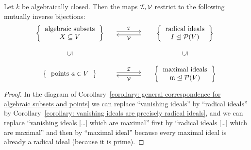 \begin{corollary}
  \label{corollary: algebraically closed correspondence for algebraic subsets and points}
  Let $k$ be algebraically closed.
  Then the maps $\mathcal{I}, \mathcal{V}$ restrict to the following mutually inverse bijections:
  \[
    \begin{matrix}
        \left\{
          \begin{tabular}{c}
              algebraic subsets \\
              $X \subseteq V$
          \end{tabular}
        \right\}
      & \begin{tikzcd}[column sep = large]
            {}
            \arrow[shift left]{r}{\mc{I}}
          & {}
            \arrow[shift left]{l}{\mc{V}}
        \end{tikzcd}
      & \left\{
          \begin{tabular}{c}
            radical ideals \\
            $I \idealleq \mc{P}(V)$
          \end{tabular}
        \right\}
      \\
        {}
      & {}
      & {}
      \\
        \rotatebox[origin=c]{90}{$\subseteq$}
      & {}
      & \rotatebox[origin=c]{90}{$\subseteq$}
      \\
        {}
      & {}
      & {}
      \\
        \left\{
          \begin{tabular}{c}
            points $a \in V$
          \end{tabular}
        \right\}
      & \begin{tikzcd}[column sep = large]
            {}
            \arrow[shift left]{r}{\mc{I}}
          & {}
            \arrow[shift left]{l}{\mc{V}}
        \end{tikzcd}
      & \left\{
          \begin{tabular}{c}
            maximal ideals \\
            $\mf{m} \idealleq \mc{P}(V)$
          \end{tabular}
        \right\}
    \end{matrix}
  \]
\end{corollary}


\begin{proof}
  In the diagram of Corollary~\ref{corollary: general correspondence for algebraic subsets and points} we can replace \enquote{vanishing ideals} by \enquote{radical ideals} by Corollary~\ref{corollary: vanishing ideals are precisely radical ideals}, and we can replace \enquote{vanishing ideals [\dots] which are maximal} first by \enquote{radical ideals [\dots] which are maximal} and then by \enquote{maximal ideal} because every maximal ideal is already a radical ideal (because it is prime).
\end{proof}


